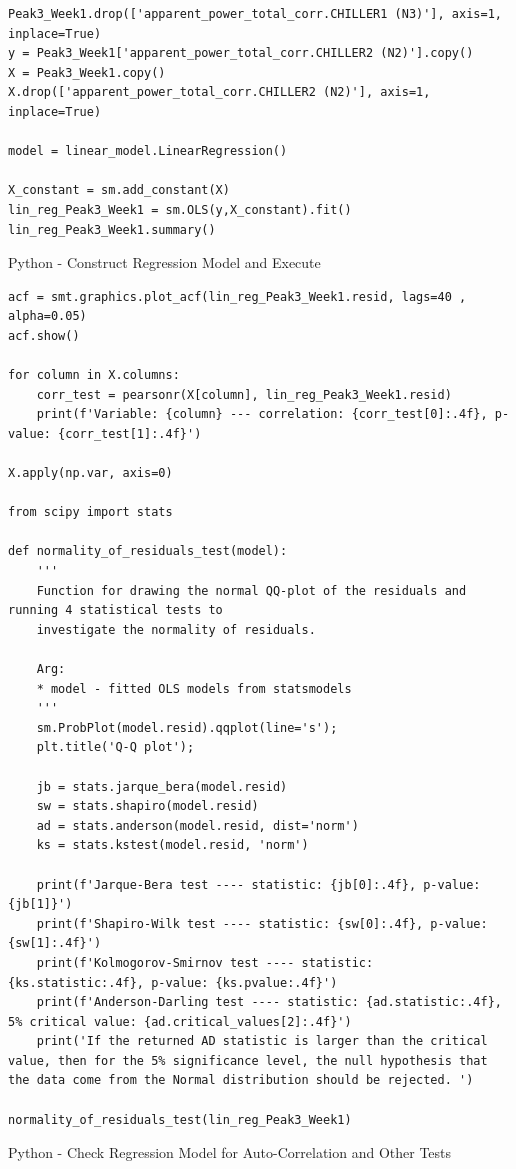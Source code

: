 \documentclass[12pt]{scrartcl}
\begin{document}
\begin{listing}[H]
\begin{verbatim}
Peak3_Week1.drop(['apparent_power_total_corr.CHILLER1 (N3)'], axis=1, inplace=True)
y = Peak3_Week1['apparent_power_total_corr.CHILLER2 (N2)'].copy() 
X = Peak3_Week1.copy()
X.drop(['apparent_power_total_corr.CHILLER2 (N2)'], axis=1, inplace=True)

model = linear_model.LinearRegression()

X_constant = sm.add_constant(X)
lin_reg_Peak3_Week1 = sm.OLS(y,X_constant).fit()
lin_reg_Peak3_Week1.summary()

\end{verbatim}
\caption{Python - Construct Regression Model and Execute}
\label{list:[Python - Construct Regression Model and Execute]}
\end{listing}


\begin{listing}[H]
\begin{verbatim}
acf = smt.graphics.plot_acf(lin_reg_Peak3_Week1.resid, lags=40 , alpha=0.05)
acf.show()

for column in X.columns:
    corr_test = pearsonr(X[column], lin_reg_Peak3_Week1.resid)
    print(f'Variable: {column} --- correlation: {corr_test[0]:.4f}, p-value: {corr_test[1]:.4f}')
    
X.apply(np.var, axis=0)

from scipy import stats

def normality_of_residuals_test(model):
    '''
    Function for drawing the normal QQ-plot of the residuals and running 4 statistical tests to 
    investigate the normality of residuals.
    
    Arg:
    * model - fitted OLS models from statsmodels
    '''
    sm.ProbPlot(model.resid).qqplot(line='s');
    plt.title('Q-Q plot');

    jb = stats.jarque_bera(model.resid)
    sw = stats.shapiro(model.resid)
    ad = stats.anderson(model.resid, dist='norm')
    ks = stats.kstest(model.resid, 'norm')
    
    print(f'Jarque-Bera test ---- statistic: {jb[0]:.4f}, p-value: {jb[1]}')
    print(f'Shapiro-Wilk test ---- statistic: {sw[0]:.4f}, p-value: {sw[1]:.4f}')
    print(f'Kolmogorov-Smirnov test ---- statistic: {ks.statistic:.4f}, p-value: {ks.pvalue:.4f}')
    print(f'Anderson-Darling test ---- statistic: {ad.statistic:.4f}, 5% critical value: {ad.critical_values[2]:.4f}')
    print('If the returned AD statistic is larger than the critical value, then for the 5% significance level, the null hypothesis that the data come from the Normal distribution should be rejected. ')
    
normality_of_residuals_test(lin_reg_Peak3_Week1)

\end{verbatim}
\caption{Python - Check Regression Model for Auto-Correlation and Other Tests}
\label{list:[Python - Check Regression Model for Auto-Correlation and Other Tests]}
\end{listing}
\end{document}
